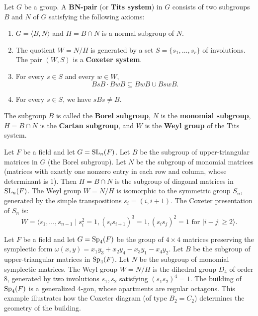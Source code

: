 \begin{definition}[BN-Pair]
Let \(G\) be a group. A \textbf{BN-pair} (or \textbf{Tits system}) in \(G\) consists of two subgroups \(B\) and \(N\) of \(G\) satisfying the following axioms:
\begin{enumerate}
    \item \(G = \langle B, N \rangle\) and \(H = B \cap N\) is a normal subgroup of \(N\).
    \item The quotient \(W = N/H\) is generated by a set \(S = \{s_1, \dots, s_r\}\) of involutions. The pair \((W, S)\) is a \textbf{Coxeter system}.
    \item For every \(s \in S\) and every \(w \in W\),
    \[
    B s B \cdot B w B \subseteq B w B \cup B s w B.
    \]
    \item For every \(s \in S\), we have \(s B s \neq B\).
\end{enumerate}
\end{definition}

The subgroup \(B\) is called the \textbf{Borel subgroup}, \(N\) is the \textbf{monomial subgroup}, \(H = B \cap N\) is the \textbf{Cartan subgroup}, and \(W\) is the \textbf{Weyl group} of the Tits system.

\begin{example}
Let \(F\) be a field and let \(G = \operatorname{SL}_n(F)\). Let \(B\) be the subgroup of upper-triangular matrices in \(G\) (the Borel subgroup). Let \(N\) be the subgroup of monomial matrices (matrices with exactly one nonzero entry in each row and column, whose determinant is 1). Then \(H = B \cap N\) is the subgroup of diagonal matrices in \(\operatorname{SL}_n(F)\). The Weyl group \(W = N/H\) is isomorphic to the symmetric group \(S_n\), generated by the simple transpositions \(s_i = (i, i+1)\). The Coxeter presentation of \(S_n\) is:
\[
W = \langle s_1, \dots, s_{n-1} \mid s_i^2 = 1, (s_i s_{i+1})^3 = 1, (s_i s_j)^2 = 1 \text{ for } |i-j| \geq 2 \rangle.
\]
\end{example}

\begin{example}
Let \(F\) be a field and let \(G = \operatorname{Sp}_4(F)\) be the group of \(4 \times 4\) matrices preserving the symplectic form \(\omega(x, y) = x_1 y_3 + x_2 y_4 - x_3 y_1 - x_4 y_2\). Let \(B\) be the subgroup of upper-triangular matrices in \(\operatorname{Sp}_4(F)\). Let \(N\) be the subgroup of monomial symplectic matrices. The Weyl group \(W = N/H\) is the dihedral group \(D_4\) of order 8, generated by two involutions \(s_1, s_2\) satisfying \((s_1 s_2)^4 = 1\). The building of \(\operatorname{Sp}_4(F)\) is a generalized 4-gon, whose apartments are regular octagons. This example illustrates how the Coxeter diagram (of type \(B_2 = C_2\)) determines the geometry of the building.
\end{example}

